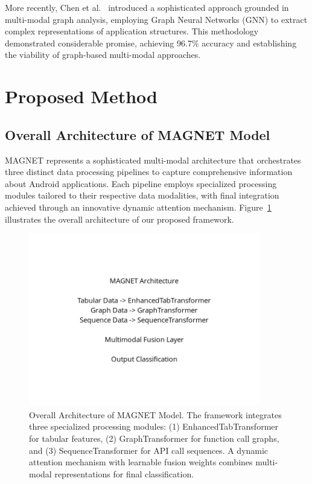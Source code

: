 \documentclass[a4paper,11pt]{article}
\begin{document}
More recently, Chen et al.~\cite{MultiModalGraphML} introduced a sophisticated approach grounded in multi-modal graph analysis, employing Graph Neural Networks (GNN) to extract complex representations of application structures. This methodology demonstrated considerable promise, achieving 96.7\% accuracy and establishing the viability of graph-based multi-modal approaches.

\section{Proposed Method}
\subsection{Overall Architecture of MAGNET Model}
MAGNET represents a sophisticated multi-modal architecture that orchestrates three distinct data processing pipelines to capture comprehensive information about Android applications. Each pipeline employs specialized processing modules tailored to their respective data modalities, with final integration achieved through an innovative dynamic attention mechanism. Figure~\ref{fig:architecture} illustrates the overall architecture of our proposed framework.

\begin{figure}[!htb]
  \centering
  \includegraphics[width=0.9\textwidth]{figures/magnet_architecture.png}
  \caption{Overall Architecture of MAGNET Model. The framework integrates three specialized processing modules: (1) EnhancedTabTransformer for tabular features, (2) GraphTransformer for function call graphs, and (3) SequenceTransformer for API call sequences. A dynamic attention mechanism with learnable fusion weights combines multi-modal representations for final classification.}
  \label{fig:architecture}
\end{figure}
\end{document}
